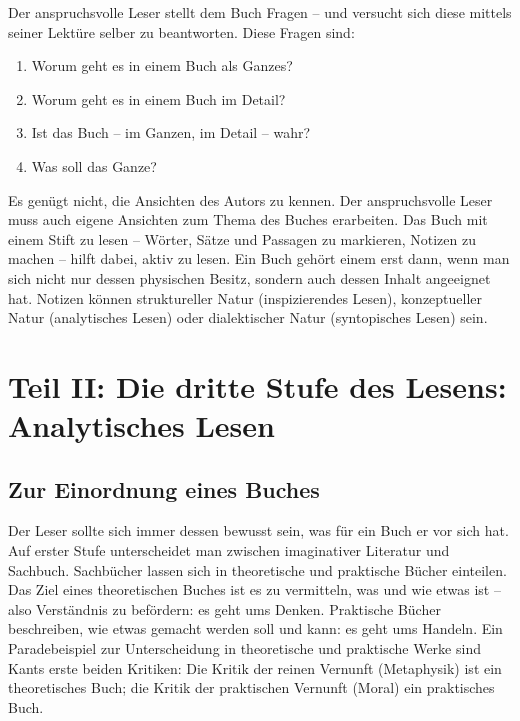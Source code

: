 \documentclass[a4paper,12pt]{scrartcl}
\begin{document}
Der anspruchsvolle Leser stellt dem Buch Fragen – und versucht sich diese mittels seiner Lektüre selber zu beantworten. Diese Fragen sind:

\begin{enumerate}
    \item Worum geht es in einem Buch als Ganzes?
    \item Worum geht es in einem Buch im Detail?
    \item Ist das Buch – im Ganzen, im Detail – wahr?
    \item Was soll das Ganze?
\end{enumerate}

Es genügt nicht, die Ansichten des Autors zu kennen. Der anspruchsvolle Leser muss auch eigene Ansichten zum Thema des Buches erarbeiten. Das Buch mit einem Stift zu lesen – Wörter, Sätze und Passagen zu markieren, Notizen zu machen – hilft dabei, aktiv zu lesen. Ein Buch gehört einem erst dann, wenn man sich nicht nur dessen physischen Besitz, sondern auch dessen Inhalt angeeignet hat. Notizen können struktureller Natur (inspizierendes Lesen), konzeptueller Natur (analytisches Lesen) oder dialektischer Natur (syntopisches Lesen) sein.

\newpage
\section*{Teil II: Die  dritte Stufe des Lesens: Analytisches Lesen}

\subsection{Zur Einordnung eines Buches}

Der Leser sollte sich immer dessen bewusst sein, was für ein Buch er vor sich hat. Auf erster Stufe unterscheidet man zwischen imaginativer Literatur und Sachbuch. Sachbücher lassen sich in theoretische und praktische Bücher einteilen. Das Ziel eines theoretischen Buches ist es zu vermitteln, was und wie etwas ist – also Verständnis zu befördern: es geht ums Denken. Praktische Bücher beschreiben, wie etwas gemacht werden soll und kann: es geht ums Handeln. Ein Paradebeispiel zur Unterscheidung in theoretische und praktische Werke sind Kants erste beiden Kritiken: Die Kritik der reinen Vernunft (Metaphysik) ist ein theoretisches Buch; die Kritik der praktischen Vernunft (Moral) ein praktisches Buch.
\end{document}
